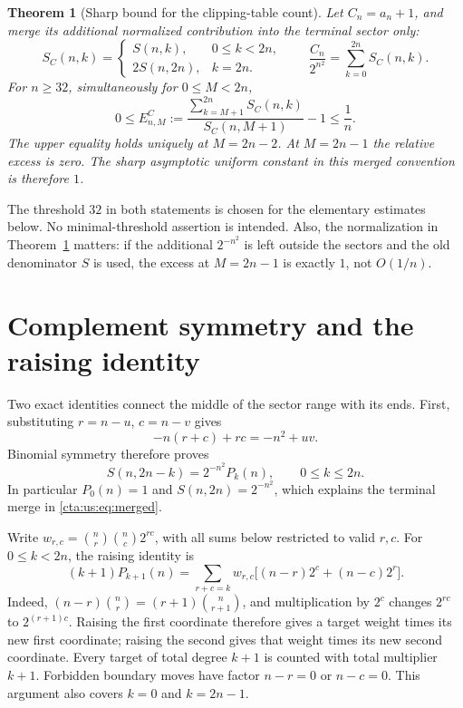 \documentclass[11pt]{article}
\newtheorem{theorem}{Theorem}[section]
\theoremstyle{definition}
\theoremstyle{remark}
\begin{document}
\begin{theorem}[Sharp bound for the clipping-table count]\label{cta:us:thm:merged}
Let $C_n=a_n+1$, and merge its additional normalized contribution into
the terminal sector only:
\begin{equation}\label{cta:us:eq:merged}
 S_C(n,k)=
 \begin{cases}S(n,k),&0\le k<2n,\\2S(n,2n),&k=2n.
 \end{cases}
 \qquad \frac{C_n}{2^{n^2}}=\sum_{k=0}^{2n}S_C(n,k).
\end{equation}
For $n\ge32$, simultaneously for $0\le M<2n$,
\begin{equation}\label{cta:us:eq:Csharp}
 0\le E^C_{n,M}:=
 \frac{\sum_{k=M+1}^{2n}S_C(n,k)}{S_C(n,M+1)}-1\le\frac1n.
\end{equation}
The upper equality holds uniquely at $M=2n-2$. At $M=2n-1$ the
relative excess is zero. The sharp asymptotic uniform constant in this
merged convention is therefore $1$.
\end{theorem}

The threshold $32$ in both statements is chosen for the elementary
estimates below. No minimal-threshold assertion is intended. Also,
the normalization in Theorem~\ref{cta:us:thm:merged} matters: if the additional
$2^{-n^2}$ is left outside the sectors and the old denominator $S$ is
used, the excess at $M=2n-1$ is exactly $1$, not $O(1/n)$.

\section{Complement symmetry and the raising identity}\label{cta:us:sec:identities}

Two exact identities connect the middle of the sector range with its
ends. First, substituting $r=n-u$, $c=n-v$ gives
\[
 -n(r+c)+rc=-n^2+uv.
\]
Binomial symmetry therefore proves
\begin{equation}\label{cta:us:eq:complement}
 S(n,2n-k)=2^{-n^2}P_k(n),\qquad 0\le k\le2n.
\end{equation}
In particular $P_0(n)=1$ and $S(n,2n)=2^{-n^2}$, which explains
the terminal merge in \eqref{cta:us:eq:merged}.

Write $w_{r,c}=\binom nr\binom nc2^{rc}$, with all sums below restricted
to valid $r,c$. For $0\le k<2n$, the raising identity is
\begin{equation}\label{cta:us:eq:raising}
 (k+1)P_{k+1}(n)=\sum_{r+c=k}w_{r,c}
                   \bigl[(n-r)2^c+(n-c)2^r\bigr].
\end{equation}
Indeed, $(n-r)\binom nr=(r+1)\binom n{r+1}$, and multiplication by
$2^c$ changes $2^{rc}$ to $2^{(r+1)c}$. Raising the first coordinate
therefore gives a target weight times its new first coordinate; raising
the second gives that weight times its new second coordinate. Every
target of total degree $k+1$ is counted with total multiplier $k+1$.
Forbidden boundary moves have factor $n-r=0$ or $n-c=0$. This argument
also covers $k=0$ and $k=2n-1$.
\end{document}
